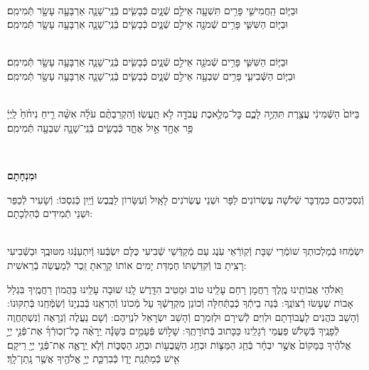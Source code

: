 \documentclass[twoside, openany, parskip=half, 11pt]{book}
\begin{document}
 \\
וּבַיּ֧וֹם הַֽחֲמִישִׁ֛י פָּרִ֥ים תִּשְׁעָ֖ה אֵילִ֣ם שְֿׁנָ֑יִם כְּֿבָשִׂ֧ים בְּֿנֵֽי־שָׁנָ֛ה אַרְבָּעָ֥ה עָשָׂ֖ר תְּֿמִימִֽם׃
\\
וּבַיּ֧וֹם הַשִּׁשִּׁ֛י פָּרִ֥ים שְֿׁמֹנָ֖ה אֵילִ֣ם שְֿׁנָ֑יִם כְּֿבָשִׂ֧ים בְּֿנֵֽי־שָׁנָ֛ה אַרְבָּעָ֥ה עָשָׂ֖ר תְּֿמִימִֽם׃



 \\
וּבַיּ֧וֹם הַשִּׁשִּׁ֛י פָּרִ֥ים שְֿׁמֹנָ֖ה אֵילִ֣ם שְֿׁנָ֑יִם כְּֿבָשִׂ֧ים בְּֿנֵֽי־שָׁנָ֛ה אַרְבָּעָ֥ה עָשָׂ֖ר תְּֿמִימִֽם׃
\\
וּבַיּ֧וֹם הַשְּֿׁבִיעִ֛י פָּרִ֥ים שִׁבְעָ֖ה אֵילִ֣ם שְֿׁנָ֑יִם כְּֿבָשִׂ֧ים בְּֿנֵֽי־שָׁנָ֛ה אַרְבָּעָ֥ה עָשָׂ֖ר תְּֿמִימִֽם׃



\\
בַּיּוֹם֙ הַשְּֿׁמִינִ֔י עֲצֶ֖רֶת תִּהְיֶ֣ה לָכֶ֑ם כׇּל־מְלֶ֥אכֶת עֲבֹדָ֖ה לֹ֥א תַֽעֲשֽׂוּ׃ וְֿהִקְרַבְתֶּ֨ם עֹלָ֜ה אִשֵּׁ֨ה רֵ֤יחַ נִיחֹ֨חַ֙ לַֽיְיָ֔ פַּ֥ר אֶחָ֖ד אַ֣יִל אֶחָ֑ד כְּֿבָשִׂ֧ים בְּֿנֵֽי־שָׁנָ֛ה שִׁבְעָ֖ה תְּֿמִימִֽם׃

\\ \label{uminchasam}
\begin{Large}\textbf{וּמִנְחָתָם}\end{Large}
וְֿנִסְכֵּיהֶם כִּמְדֻבָּר שְֿׁלֹשָׁה עֶשְׂרוֹנִים לַפָּר וּשְׁנֵי עֶשְׂרֹנִים לָאָֽיִל וְֿעִשָּׂרוֹן לַכֶּֽבֶשׂ וְֿיַֽיִן כְּֿנִסְכּוֹ: וְֿשָׂעִיר לְֿכַפֵּר וּשְׁנֵי תְֿמִידִים כְּֿהִלְכָתָם:

\begin{sometimes}

\shabbos\\
יִשְׂמְֿחוּ בְֿמַלְכוּתְךָ שׁוֹמְֿרֵי שַׁבָּת וְֿקֽוֹרְֿאֵי עֹֽנֶג עַם מְֿקַדְּֿשֵׁי שְֿׁבִיעִי כֻּלָּם יִשְׂבְּֿעוּ וְֿיִתְעַנְּֿגוּ מִטּוּבֶֽךָ וּבַשְּֿׁבִיעִי רָצִֽיתָ בּוֹ וְֿקִדַּשְׁתּוֹ חֶמְדַּת יָמִים אוֹתוֹ קָרָֽאתָ זֵֽכֶר לְֿמַעֲשֵׂה בְֿרֵאשִׁית:

\end{sometimes}

\enlargethispage{\baselineskip}
וֵאלֹהֵי אֲבוֹתֵֽינוּ מֶֽלֶךְ רַחֲמָן רַחֵם עָלֵֽינוּ טוֹב וּמֵטִיב הִדָּֽרֶשׁ לָֽנוּ שׁוּבָה עָלֵֽינוּ בַּהֲמוֹן רַחֲמֶֽיךָ בִּגְלַל אָבוֹת שֶׁעָשׂוּ רְֿצוֹנֶֽךָ: בְּֿנֵה בֵיתְֿךָ כְּֿבַתְּֿחִלָּה וְֿכוֹנֵן מִקְדָשְֿׁךָ עַל מְֿכוֹנוֹ וְֿהַרְאֵֽנוּ בְּֿבִנְיָנוֹ וְֿשַׂמְּֿחֵֽנוּ בְּֿתִקּוּנוֹ: וְֿהָשֵׁב כֹּהֲנִים לַעֲבוֹדָתָם וּלְוִיִּם לְֿשִׁירָם וּלְזִמְרָם וְֿהָשֵׁב יִשְׂרָאֵל לִנְוֵיהֶם: וְֿשָׁם נַעֲלֶה וְֿנֵרָאֶה וְֿנִשְׁתַּחֲוֶה לְֿפָנֶֽיךָ בְּֿשָׁלֹֹשׁ פַּעֲמֵי רְֿגָלֵֽינוּ כַּכָּתוּב בְּֿתוֹרָתֶֽךָ: שָׁל֣וֹשׁ פְּֿעָמִ֣ים בַּשָּׁנָ֡ה יֵֽרָאֶ֨ה כׇל־זְכֽוּרְֿךָ֜ אֶת־פְּֿנֵ֣י יְיָ֣ אֱלֹהֶ֗יךָ בַּמָּקוֹם֙ אֲשֶׁ֣ר יִבְחָ֔ר בְּֿחַ֧ג הַמַּצּ֛וֹת וּבְחַ֥ג הַשָּֽׁבֻע֖וֹת וּבְחַ֣ג הַסֻּכּ֑וֹת וְֿלֹ֧א יֵֽרָאֶ֛ה אֶת־פְּֿנֵ֥י יְיָ֖ רֵיקָֽם׃ אִ֖ישׁ כְּֿמַתְּֿנַֽת יָד֑וֹ כְּֿבִרְכַּ֛ת יְיָ֥ אֱלֹהֶ֖יךָ אֲשֶׁ֥ר נָֽתַן־לָֽךְ׃
\end{document}
